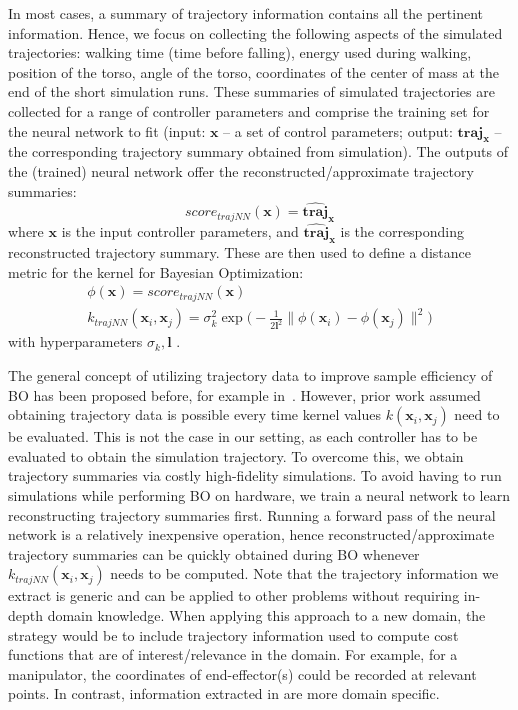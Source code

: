 In most cases, a summary of trajectory information contains all the pertinent information. Hence, we focus on collecting the following aspects of the simulated trajectories: walking time (time before falling), energy used during walking, position of the torso, angle of the torso, coordinates of the center of mass at the end of the short simulation runs. These summaries of simulated trajectories are collected for a range of controller parameters and comprise the training set for the neural network to fit (input: $\pmb{x}$ -- a set of control parameters; output: $\pmb{traj_x}$ -- the corresponding trajectory summary obtained from simulation). The outputs of the (trained) neural network offer the reconstructed/approximate trajectory summaries:
\begin{equation}
    score_{\textit{trajNN}}(\pmb{x}) = \pmb{\widehat{traj}_x}
\end{equation}
where $\pmb{x}$ is the input controller parameters, and $\pmb{\widehat{traj}_x}$ is the corresponding reconstructed trajectory summary.
These are then used to define a distance metric for the kernel for Bayesian Optimization:
\begin{align}
\phi(\pmb{x}) = score_{trajNN}(\pmb{x})\\
k_{\textit{trajNN}}(\pmb{x}_i, \pmb{x}_j) = \sigma_k^2 \exp\Big(- \frac{1}{2 \pmb{l}^2} \|\phi(\pmb{x}_i) - \phi(\pmb{x}_j)\|^2 \Big)
\end{align}
with hyperparameters $\sigma_k, \pmb{l}$ .

The general concept of utilizing trajectory data to improve sample efficiency of BO has been proposed before, for example in~\cite{wilson2014using}. However, prior work assumed obtaining trajectory data is possible every time kernel values $k(\pmb{x}_i, \pmb{x}_j)$ need to be evaluated. This is not the case in our setting, as each controller has to be evaluated to obtain the simulation trajectory. To overcome this, we obtain trajectory summaries via costly high-fidelity simulations. To avoid having to run simulations while performing BO on hardware, we train a neural network to learn reconstructing trajectory summaries first. Running a forward pass of the neural network is a relatively inexpensive operation, hence reconstructed/approximate trajectory summaries can be quickly obtained during BO whenever $k_{\textit{trajNN}}(\pmb{x}_i, \pmb{x}_j)$ needs to be computed. Note that the trajectory information we extract is generic and can be applied to other problems without requiring in-depth domain knowledge. When applying this approach to a new domain, the strategy would be to include trajectory information used to compute cost functions that are of interest/relevance in the domain. For example, for a manipulator, the coordinates of  end-effector(s) could be recorded at relevant points. In contrast, information extracted in \cite{rai2016sample, cully2015robots} are more domain specific.

